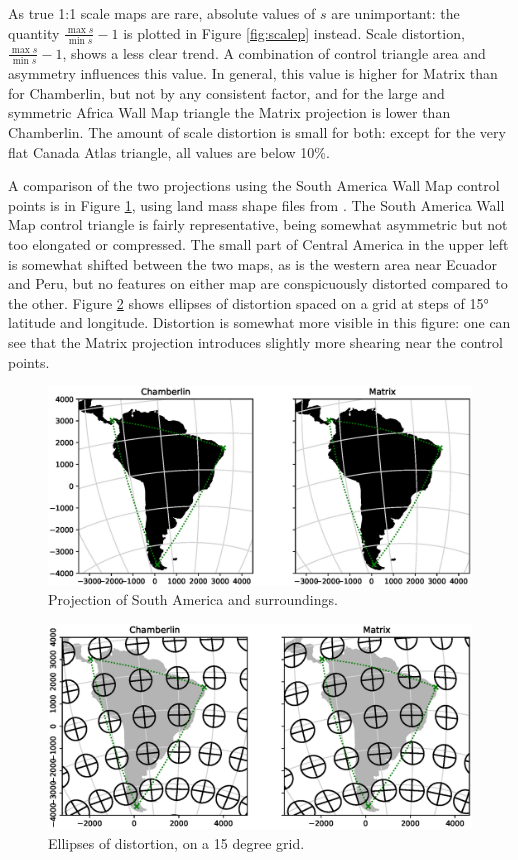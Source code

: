 \documentclass[]{interact}
\begin{document}
As true 1:1 scale maps are rare, absolute values of $s$ are unimportant: the
quantity $\frac{\max s}{\min s} - 1$ is plotted in Figure \ref{fig:scalep}
instead. Scale distortion, $\frac{\max s}{\min s} - 1$, shows a less clear
trend. A combination of control triangle area and asymmetry influences this
value. In general, this value is higher for Matrix than for Chamberlin, but
not by any consistent factor, and for the large and symmetric Africa Wall Map
triangle the Matrix projection is lower than Chamberlin. The amount of scale
distortion is small for both: except for the very flat Canada Atlas triangle,
all values are below 10\%.

A comparison of the two projections using the South America Wall Map control
points is in Figure \ref{fig:proj}, using land mass shape files from
\citet{natearth}. The South America Wall Map control triangle is fairly
representative, being somewhat asymmetric but not too elongated or compressed.
The small part of Central America in the upper left is somewhat shifted between
the two maps, as is the western area near Ecuador and Peru, but no features on
either map are conspicuously distorted compared to the other. Figure
\ref{fig:tissot} shows ellipses of distortion spaced on a grid at steps of 15°
latitude and longitude. Distortion is somewhat more visible in this figure:
one can see that the Matrix projection introduces
slightly more shearing near the control points.

\begin{figure}%
  \includegraphics[width=\textwidth]{SA_Wall_Map_zoom}
  \caption{Projection of South America and surroundings.}
  \label{fig:proj}
\end{figure}

\begin{figure}%
  \includegraphics[width=\textwidth]{SA_Wall_Map_tissot}
  \caption{Ellipses of distortion, on a 15 degree grid.}
  \label{fig:tissot}
\end{figure}
\end{document}
